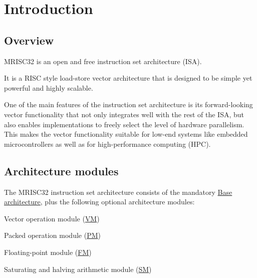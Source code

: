 %

\chapter{Introduction}

\section{Overview}

MRISC32 is an open and free instruction set architecture (ISA).

It is a RISC style load-store vector architecture that is designed to be simple
yet powerful and highly scalable.

One of the main features of the instruction set architecture is its
forward-looking vector functionality that not only integrates well with the
rest of the ISA, but also enables implementations to freely select the level of
hardware parallelism. This makes the vector functionality suitable for low-end
systems like embedded microcontrollers as well as for high-performance
computing (HPC).


\section{Architecture modules}

The MRISC32 instruction set architecture consists of the mandatory
\hyperref[module:Base]{Base architecture}, plus the following optional
architecture modules:

\begin{bulletitems}
  \item Vector operation module (\hyperref[module:VM]{VM})
  \item Packed operation module (\hyperref[module:PM]{PM})
  \item Floating-point module (\hyperref[module:FM]{FM})
  \item Saturating and halving arithmetic module (\hyperref[module:SM]{SM})
\end{bulletitems}

